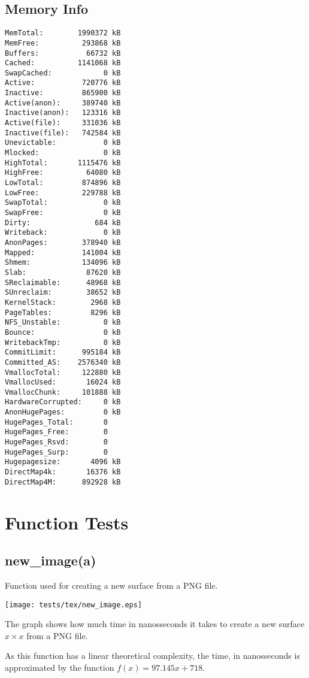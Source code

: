 \documentclass{article}
\begin{document}
\subsection{Memory Info}
\begin{verbatim}
MemTotal:        1990372 kB
MemFree:          293868 kB
Buffers:           66732 kB
Cached:          1141068 kB
SwapCached:            0 kB
Active:           720776 kB
Inactive:         865900 kB
Active(anon):     389740 kB
Inactive(anon):   123316 kB
Active(file):     331036 kB
Inactive(file):   742584 kB
Unevictable:           0 kB
Mlocked:               0 kB
HighTotal:       1115476 kB
HighFree:          64080 kB
LowTotal:         874896 kB
LowFree:          229788 kB
SwapTotal:             0 kB
SwapFree:              0 kB
Dirty:               684 kB
Writeback:             0 kB
AnonPages:        378940 kB
Mapped:           141004 kB
Shmem:            134096 kB
Slab:              87620 kB
SReclaimable:      48968 kB
SUnreclaim:        38652 kB
KernelStack:        2968 kB
PageTables:         8296 kB
NFS_Unstable:          0 kB
Bounce:                0 kB
WritebackTmp:          0 kB
CommitLimit:      995184 kB
Committed_AS:    2576340 kB
VmallocTotal:     122880 kB
VmallocUsed:       16024 kB
VmallocChunk:     101888 kB
HardwareCorrupted:     0 kB
AnonHugePages:         0 kB
HugePages_Total:       0
HugePages_Free:        0
HugePages_Rsvd:        0
HugePages_Surp:        0
Hugepagesize:       4096 kB
DirectMap4k:       16376 kB
DirectMap4M:      892928 kB
\end{verbatim}
\section{Function Tests}
\subsection{new\_image(a)}
Function used for creating a new surface from a PNG file.

\texttt{[image: tests/tex/new\_image.eps]}

The graph shows how much time in nanosseconds it takes to create a new surface $x \times x $ from a PNG file.

As this function has a linear theoretical
complexity, the time, in nanosseconds is 
approximated by the function $f(x)=97.145x+718$.
\end{document}
